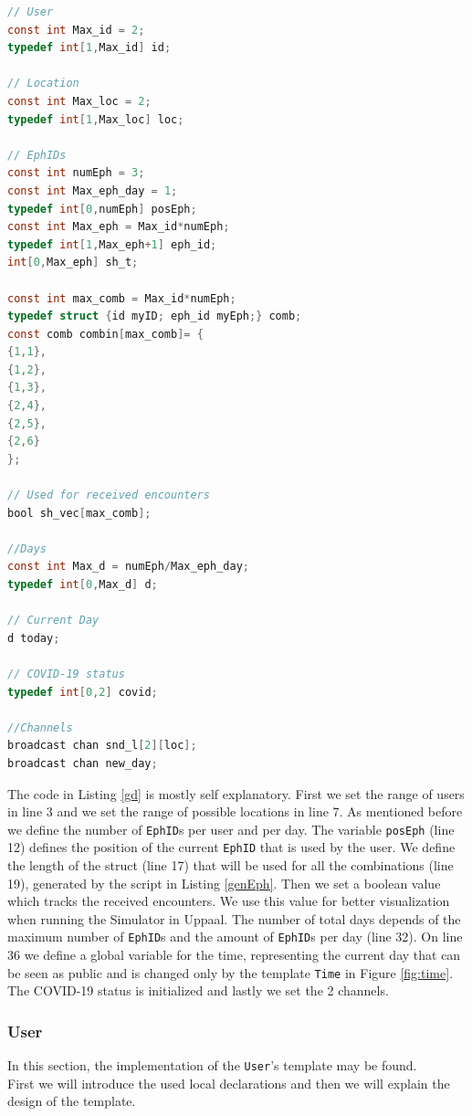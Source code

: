 \documentclass[a4paper, twocolumn]{article}
\begin{document}
\begin{lstlisting}[language=C, caption= Global Declarations,label={gd},xleftmargin=.02\textwidth]
// User
const int Max_id = 2;
typedef int[1,Max_id] id;

// Location
const int Max_loc = 2;
typedef int[1,Max_loc] loc;

// EphIDs
const int numEph = 3;
const int Max_eph_day = 1;
typedef int[0,numEph] posEph;
const int Max_eph = Max_id*numEph;
typedef int[1,Max_eph+1] eph_id;
int[0,Max_eph] sh_t;

const int max_comb = Max_id*numEph;
typedef struct {id myID; eph_id myEph;} comb;
const comb combin[max_comb]= {
{1,1},
{1,2},
{1,3},
{2,4},
{2,5},
{2,6}
};

// Used for received encounters
bool sh_vec[max_comb];

//Days
const int Max_d = numEph/Max_eph_day;
typedef int[0,Max_d] d;

// Current Day
d today;

// COVID-19 status
typedef int[0,2] covid;

//Channels
broadcast chan snd_l[2][loc];
broadcast chan new_day;
\end{lstlisting}
The code in Listing \ref{gd} is mostly self explanatory. First we set the range of users in line 3 and we set the range of possible locations in line 7. As mentioned before we define the number of \texttt{EphID}s per user and per day. The variable \texttt{posEph} (line 12) defines the position of the current \texttt{EphID} that is used by the user. We define the length of the struct (line 17) that will be used for all the combinations (line 19), generated by the script in Listing \ref{genEph}. Then we set a boolean value which tracks the received encounters. We use this value for better visualization when running the Simulator in Uppaal. The number of total days depends of the maximum number of \texttt{EphID}s and the amount of \texttt{EphID}s per day (line 32). On line 36 we define a global variable for the time, representing the current day that can be seen as public and is changed only by the template \texttt{Time} in Figure \ref{fig:time}.\\
The COVID-19 status is initialized and lastly we set the 2 channels. 

\subsubsection{User}
In this section, the implementation of the \texttt{User}'s template may be found.\\
First we will introduce the used local declarations and then we will explain the design of the template.
\end{document}
